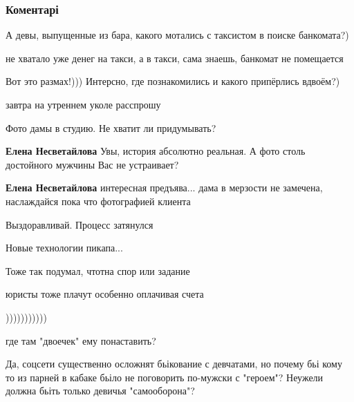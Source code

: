  
 
 
 
 
\subsubsection{Коментарі}

\begin{itemize} %
А девы, выпущенные из бара, какого мотались с таксистом в поиске банкомата?)

\begin{itemize} %
не хватало уже денег на такси, а в такси, сама знаешь, банкомат не помещается

Вот это размах!))) Интерсно, где познакомились и какого припёрлись вдвоём?)

завтра на утреннем уколе расспрошу

Фото дамы в студию.
Не хватит ли придумывать?

\textbf{Елена Несветайлова} Увы, история абсолютно реальная. А фото столь достойного мужчины Вас не устраивает?

\textbf{Елена Несветайлова} интересная предъява... дама в мерзости не замечена, наслаждайся пока что фотографией клиента

Выздоравливай. Процесс затянулся
\end{itemize} %

Новые технологии пикапа...

Тоже так подумал, чтотна спор или задание

юристы тоже плачут особенно оплачивая счета

)))))))))))

где там "двоечек" ему понаставить?


Да, соцсети существенно осложнят бьікование с девчатами, но почему бьі кому то
из парней в кабаке бьіло не поговорить по-мужски с "героем"? Неужели должна
бьіть только девичья "самооборона"?


\end{itemize}
